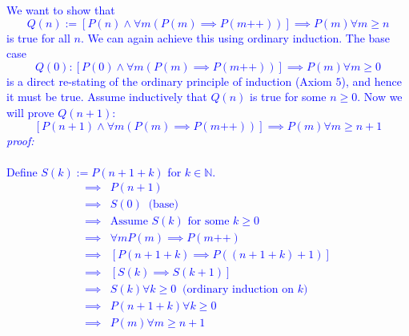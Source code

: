 \documentclass[12pt]{article}
\begin{document}
\begin{enumerate}[leftmargin=*, label=\textbf{\arabic*.}]
	\textcolor{blue}{	We want to show that $$Q(n) := [P(n) \land \forall m (P(m) \implies P(m\text{++}))] \implies P(m) \forall m \geq n$$ is true for all $n$. We can again achieve this using ordinary induction. The base case  $$Q(0) : [P(0) \land \forall m (P(m) \implies P(m\text{++}))] \implies P(m) \forall m \geq 0$$ is a direct re-stating of the ordinary principle of induction (Axiom $5$), and hence it must be true. Assume inductively that $Q(n)$ is true for some $n \geq 0$. Now we will prove $Q(n+1)$: 
	$$[P(n+1) \land \forall m (P(m) \implies P(m\text{++}))] \implies P(m) \forall m \geq n+1$$
	\textit{proof:} \\ \\
	Define $S(k) := P(n+1+k)$ for $k \in \mathbb{N}$.
	\begin{align*}
	[P(n+1) \land \forall m (P(m) \implies P(m\text{++}))] \implies& P(n+1) \\
	\implies& S(0) \;\; \text{(base)} \\
	\implies& \text{Assume $S(k)$ for some $k \geq 0$} \\
	\implies& \forall m P(m) \implies P(m\text{++}) \\
	\implies& [P(n+1+k) \implies P((n+1+k) + 1)] \\
	\implies& [S(k) \implies S(k+1)] \\
	\implies& S(k) \forall k \geq 0 \;\; \text{(ordinary induction on $k$)} \\
	\implies& P(n+1+k) \forall k \geq 0\\
	\implies& P(m) \forall m \geq n+1 \\
	\end{align*}
 	}	
\end{enumerate}
\end{document}
